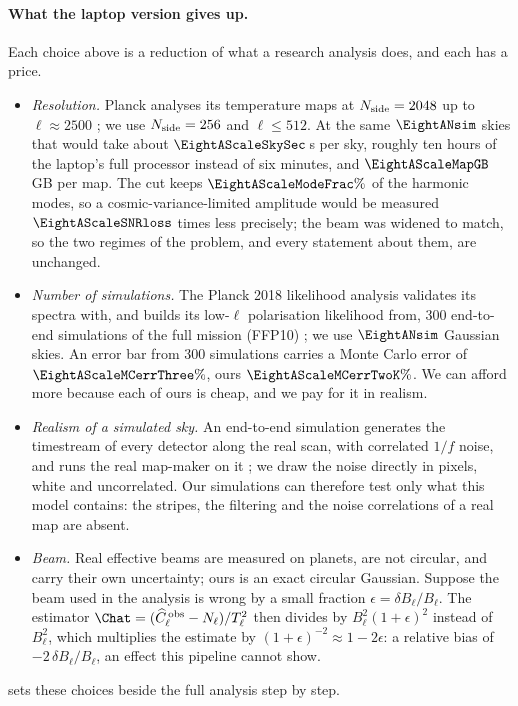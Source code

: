 \paragraph{What the laptop version gives up.}
Each choice above is a reduction of what a research analysis does, and each has a price.
\begin{itemize}
  \item \emph{Resolution.} Planck analyses its temperature maps at $N_{\rm side}=2048$ up to
        $\ell\approx2500$ \cite{Planck2018V}; we use $N_{\rm side}=256$ and $\ell\le512$. At the same
        $\EightANsim$ skies that would take about $\EightAScaleSkySec$\,s per sky, roughly ten hours
        of the laptop's full processor instead of six minutes, and $\EightAScaleMapGB$\,GB per map.
        The cut keeps $\EightAScaleModeFrac\%$ of the harmonic modes, so a cosmic-variance-limited
        amplitude would be measured $\EightAScaleSNRloss$ times less precisely; the beam was
        widened to match, so the two regimes of the problem, and every statement about them, are
        unchanged.
  \item \emph{Number of simulations.} The Planck 2018 likelihood analysis validates its
        spectra with, and builds its low-$\ell$ polarisation likelihood from, $300$ end-to-end
        simulations of the full mission (FFP10) \cite{Planck2018V}; we use $\EightANsim$ Gaussian
        skies. An error bar from $300$ simulations carries a Monte Carlo error of
        $\EightAScaleMCerrThree\%$, ours $\EightAScaleMCerrTwoK\%$. We can afford more because each of
        ours is cheap, and we pay for it in realism.
  \item \emph{Realism of a simulated sky.} An end-to-end simulation generates the timestream
        of every detector along the real scan, with correlated $1/f$ noise, and runs the
        real map-maker on it ; we draw the noise directly in pixels, white
        and uncorrelated. Our simulations can therefore test only what this model contains: the
        stripes, the filtering and the noise correlations of a real map are absent.
  \item \emph{Beam.} Real effective beams are measured on planets, are not circular, and
        carry their own uncertainty; ours is an exact circular Gaussian. Suppose the beam used in
        the analysis is wrong by a small fraction $\epsilon=\delta B_\ell/B_\ell$. The estimator
        $\Chat=(\widehat C^{\,\rm obs}_\ell-N_\ell)/T_\ell^2$ then divides by $B_\ell^2(1+\epsilon)^2$
        instead of $B_\ell^2$, which multiplies the estimate by $(1+\epsilon)^{-2}\approx1-2\epsilon$:
        a relative bias of $-2\,\delta B_\ell/B_\ell$, an effect this pipeline cannot show.
\end{itemize}
 sets these choices beside the full analysis step by step.
